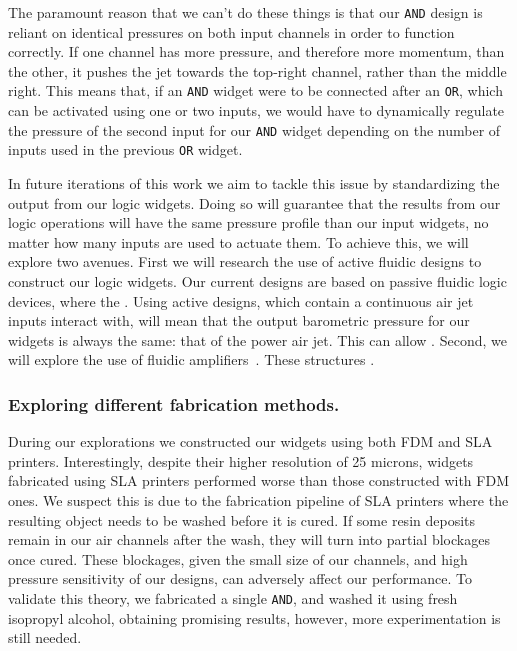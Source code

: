         The paramount reason that we can't do these things is that our
        \texttt{AND} design is reliant on identical pressures on both input
        channels in order to function correctly. If one channel has more
        pressure, and therefore more momentum, than the other, it pushes
        the jet towards the top-right channel, rather than the middle
        right. This means that, if an \texttt{AND} widget were to be
        connected after an \texttt{OR}, which can be activated using one or
        two inputs, we would have to dynamically regulate the pressure of
        the second input for our \texttt{AND} widget depending on the
        number of inputs used in the previous \texttt{OR} widget.

        In future iterations of this work we aim to tackle this issue by
        standardizing the output from our logic widgets. Doing so will
        guarantee that the results from our logic operations will have the
        same pressure profile than our input widgets, no matter how many
        inputs are used to actuate them. To achieve this, we will explore
        two avenues. First we will research the use of active fluidic
        designs to construct our logic widgets. Our current designs are
        based on passive fluidic logic devices, where the . Using active designs, which
        contain a continuous air jet inputs interact with, will mean that
        the output barometric pressure for our widgets is always the same:
        that of the power air jet. This can allow . Second,
        we will explore the use of fluidic
        amplifiers~\cite{CharlesBelsterling:1971}. These structures
        .
        
      \subsubsection{Exploring different fabrication methods.} 
        During our explorations we constructed our widgets using both FDM
        and SLA printers. Interestingly, despite their higher resolution of
        25 microns, widgets fabricated using SLA printers performed worse
        than those constructed with FDM ones. We suspect this is due to the
        fabrication pipeline of SLA printers where the resulting object
        needs to be washed before it is cured. If some resin deposits remain in
        our air channels after the wash, they will turn into partial
        blockages once cured. These blockages, given the small size of our
        channels, and high pressure sensitivity of our designs, can
        adversely affect our performance. To validate this theory, we
        fabricated a single \texttt{AND}, and washed it using fresh
        isopropyl alcohol, obtaining promising results, however, more
        experimentation is still needed.

